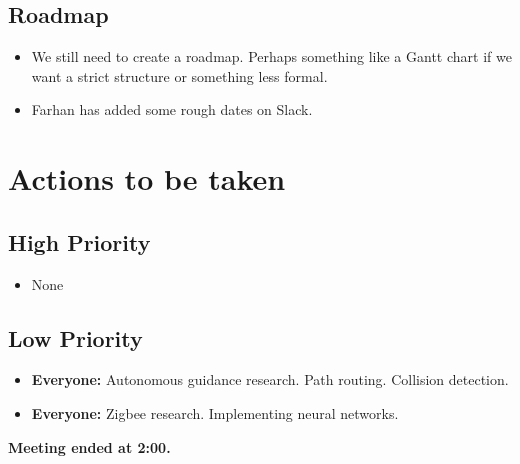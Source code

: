 \documentclass[a4paper]{article}
\begin{document}
	\subsection{Roadmap}
	\begin{itemize}
		\item We still need to create a roadmap. Perhaps something like a Gantt chart if we want a strict structure or something less formal.
		\item Farhan has added some rough dates on Slack.
	\end{itemize}


	\section{Actions to be taken}
	\subsection{High Priority}
	\begin{itemize}
 		\item None
	\end{itemize}
	\subsection{Low Priority}
	\begin{itemize}
		\item \textbf{Everyone:} Autonomous guidance research. Path routing. Collision detection.
		\item \textbf{Everyone:} Zigbee research. Implementing neural networks.
	\end{itemize}
	\textbf{Meeting ended at 2:00.}
\end{document}
